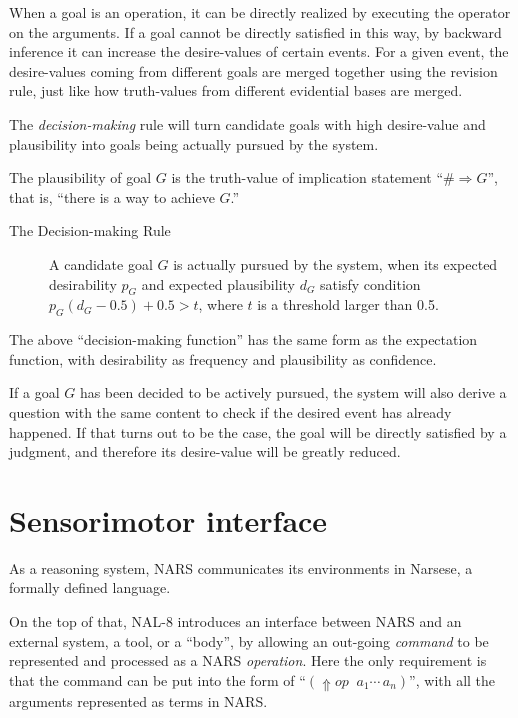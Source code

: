 When a goal is an operation, it can be directly realized by executing the operator on the arguments. If a goal cannot be directly satisfied in this way, by backward inference it can increase the desire-values of certain events. For a given event, the desire-values coming from different goals are merged together using the revision rule, just like how truth-values from different evidential bases are merged.

The \emph{decision-making} rule will turn candidate goals with high desire-value and plausibility into goals being actually pursued by the system. 

\begin{defi}
The plausibility of goal $G$ is the truth-value of implication statement ``\(\# \Rightarrow G\)'', that is, ``there is a way to achieve $G$.'' 
\end{defi}

\begin{description}
  \item[The Decision-making Rule] A candidate goal $G$ is actually pursued by the system, when its expected desirability $p_G$ and expected plausibility $d_G$ satisfy condition \(p_G(d_G - 0.5) + 0.5 > t\), where $t$ is a threshold larger than 0.5. 
\end{description}
The above ``decision-making function'' has the same form as the expectation function, with desirability as frequency and plausibility as confidence.

If a goal $G$ has been decided to be actively pursued, the system will also derive a question with the same content to check if the desired event has already happened. If that turns out to be the case, the goal will be directly satisfied by a judgment, and therefore its desire-value will be greatly reduced.


\section{Sensorimotor interface}

As a reasoning system, NARS communicates its environments in Narsese, a formally defined language.

On the top of that, NAL-8 introduces an interface between NARS and an external system, a tool, or a ``body'', by allowing an out-going \emph{command} to be represented and processed as a NARS \emph{operation}. Here the only requirement is that the command can be put into the form of ``\((\Uparrow\!\!op \;\; a_1 \cdots \, a_n)\)'', with all the arguments represented as terms in NARS.

